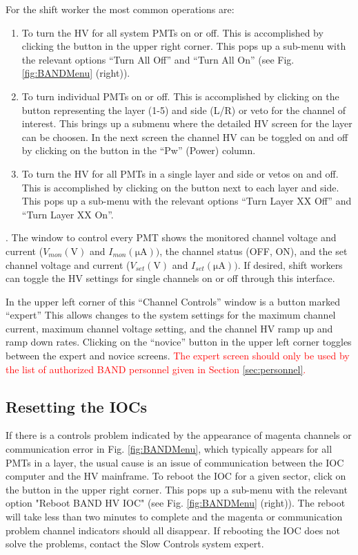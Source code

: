 \documentclass[12pt,letterpaper]{article}
\begin{document}
For the shift worker the most common operations are:
\begin{enumerate}
\item To turn the HV for all system PMTs on or off. This is accomplished by clicking the button in the upper right corner. This pops up a sub-menu with the relevant options “Turn All Off” and “Turn All On” (see Fig. \ref{fig:BANDMenu} (right)).
\item To turn individual PMTs on or off. This is accomplished by clicking on the button representing the layer (1-5) and side (L/R) or veto for the channel of interest. This brings up a submenu where the detailed HV screen for the layer can be choosen. %
In the next screen the channel HV can be toggled on and off by clicking on the button in the “Pw” (Power) column.
\item To turn the HV for all PMTs in a single layer and side or vetos on and off. This is accomplished by clicking on the button next to each layer and side. This pops up a sub-menu with the relevant options “Turn Layer XX Off” and “Turn Layer XX On”.
\end{enumerate}
.
The window to control every PMT shows the monitored channel voltage and current ($V_{mon} (\mathrm{V})$ and $I_{mon} (\mathrm{\mu A}))$, the channel status (OFF, ON), and the set channel voltage and current ($V_{set} (\mathrm{V})$ and $I_{set} (\mathrm{\mu A}))$. If desired, shift workers can toggle the HV settings for single channels on or off through this interface.

In the upper left corner of this “Channel Controls” window is a button marked “expert” %
This allows changes to the system settings for the maximum channel current, maximum channel voltage setting, and the channel HV ramp up and ramp down rates. Clicking on the “novice” button in the upper left corner toggles between the expert and novice screens. \textcolor{red}{The expert screen should only be used by the list of authorized BAND personnel given in Section \ref{sec:personnel}.}
\subsection{Resetting the IOCs}
If there is a controls problem indicated by the appearance of magenta channels or communication error in Fig. \ref{fig:BANDMenu}, which typically appears for all PMTs in a layer, the usual cause is an issue of communication between the IOC computer and the HV mainframe. To reboot the IOC for a given sector, click on the button in the upper right corner. This pops up a sub-menu with the relevant option "Reboot BAND HV IOC" (see Fig. \ref{fig:BANDMenu} (right)). The reboot will take less than two minutes to complete and the magenta or communication problem channel indicators should all disappear. If rebooting the IOC does not solve the problems, contact the Slow Controls system expert.
\end{document}
